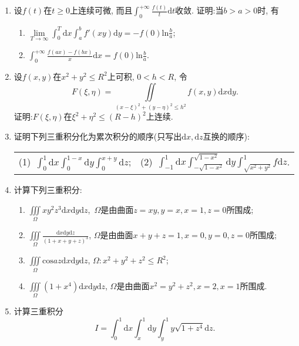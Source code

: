 \begin{enumerate}
\begin{table}[H]
\begin{tabular}{ll}
	\end{tabular}
\end{table}
\item 设$f(t)$在$t\ge 0$上连续可微, 而且$\displaystyle{\int_{0}^{+\infty}\frac{f(t)}{t}\mathrm{d}t}$收敛. 证明:当$b>a>0$时, 有
\begin{enumerate}
	\item $\lim\limits_{T\rightarrow \infty}\int_{0}^{T}\mathrm{d}x\int_{a}^{b}f'(xy)\mathrm{d}y=-f(0)\mathrm{ln}\frac{b}{a}$;
	\item $\displaystyle{\int_{0}^{+\infty}\frac{f(ax)-f(bx)}{x}\mathrm{d}x=f(0)\mathrm{ln}\frac{b}{a}}$.
\end{enumerate}
\item 设$f(x,y)$在$x^2+y^2\le R^2$上可积, $0<h<R$, 令
$$	F(\xi,\eta) = \underset{(x-\xi)^2+(y-\eta)^2\le h^2}{\iint}f(x,y)\mathrm{d}x\mathrm{d}y.$$
证明:$F(\xi,\eta)$在$\xi^2+\eta^2\le (R-h)^2$上连续.
\item 证明下列三重积分化为累次积分的顺序(只写出$\mathrm{d}x,\mathrm{d}z$互换的顺序):
\begin{table}[H]
	\begin{tabular}{ll}
	\qquad	(1)\ $\displaystyle{\int_{0}^{1}\mathrm{d}x\int_{0}^{1-x}\mathrm{d}y\int_{0}^{x+y}}\mathrm{d}z$;\qquad \qquad \qquad \qquad &(2)\ $\displaystyle{\int_{-1}^{1}\mathrm{d}x\int_{-\sqrt{1-x^2}}^{\sqrt{1-x^2}}\mathrm{d}y\int_{\sqrt{x^2+y^2}}^{1}f\mathrm{d}z}$.
	\end{tabular}
\end{table}
\item 计算下列三重积分:
\begin{enumerate}
		\item $\displaystyle{\underset{\Omega}{\iiint}xy^2z^3\mathrm{d}x\mathrm{d}y\mathrm{d}z}$,\ $\Omega$是由曲面$z=xy,y=x,x=1,z=0$所围成;
		\item $\displaystyle{\underset{\Omega}{\iiint}\frac{\mathrm{d}x\mathrm{d}y\mathrm{d}z}{(1+x+y+z)^3}}$, $\Omega$是由曲面$x+y+z=1,x=0,y=0,z=0$所围成;
		\item $\displaystyle{\underset{\Omega}{\iiint}\mathrm{cos}az\mathrm{d}x\mathrm{d}y\mathrm{d}z}$, $\Omega:x^2+y^2+z^2\le R^2$;
		\item $\displaystyle{\underset{\Omega}{\iiint}(1+x^4)\mathrm{d}x\mathrm{d}y\mathrm{d}z}$, $\Omega$是由曲面$x^2=y^2+z^2,x=2,x=1$所围成.
\end{enumerate}
\item 计算三重积分
$$I=\displaystyle{\int_{0}^{1}\mathrm{d}x\int_{x}^{1}\mathrm{d}y\int_{y}^{1}y\sqrt{1+z^4}\mathrm{d}z}.$$
\end{enumerate}
